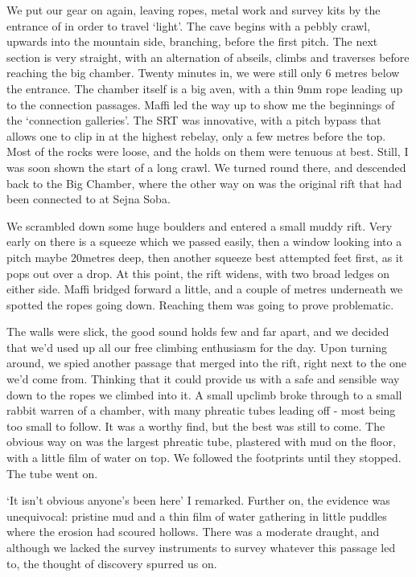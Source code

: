 We put our gear on again, leaving ropes, metal work and survey kits by the entrance of  in order to travel `light'. The cave begins with a pebbly crawl, upwards into the mountain side, branching, before the first pitch. The next section is very straight, with an alternation of abseils, climbs and traverses before reaching the big chamber. Twenty minutes in, we were still only 6 metres below the entrance. The chamber itself is a big aven, with a thin 9mm rope leading up to the connection passages. Maffi led the way up to show me the beginnings of the `connection galleries'. The SRT was innovative, with a pitch bypass that allows one to clip in at the highest rebelay, only a few metres before the top. Most of the rocks were loose, and the holds on them were tenuous at best. Still, I was soon shown the start of a long crawl. We turned round there, and descended back to the Big Chamber, where the other way on was the original  rift that had been connected to  at Sejna Soba. 

We scrambled down some huge boulders and entered a small muddy rift. Very early on there is a squeeze which we passed easily, then a window looking into a pitch maybe 20metres deep, then another squeeze best attempted feet first, as it pops out over a drop. At this point, the rift widens, with two broad ledges on either side. Maffi bridged forward a little, and a couple of metres underneath we spotted the ropes going down. Reaching them was going to prove problematic. 

The walls were slick, the good sound holds few and far apart, and we decided that we'd used up all our free climbing enthusiasm for the day. Upon turning around, we spied another passage that merged into the rift, right next to the one we'd come from. Thinking that it could provide us with a safe and sensible way down to the ropes we climbed into it. 
A small upclimb broke through to a small rabbit warren of a chamber, with many phreatic tubes leading off - most being too small to follow. It was a worthy find, but the best was still to come. The obvious way on was the largest phreatic tube, plastered with mud on the floor, with a little film of water on top. We followed the footprints until they stopped. The tube went on.

`It isn't obvious anyone's been here' I remarked. Further on, the evidence was unequivocal: pristine mud and a thin film of water gathering in little puddles where the erosion had scoured hollows. There was a moderate draught, and although we lacked the survey instruments to survey whatever this passage led to, the thought of discovery spurred us on. 

